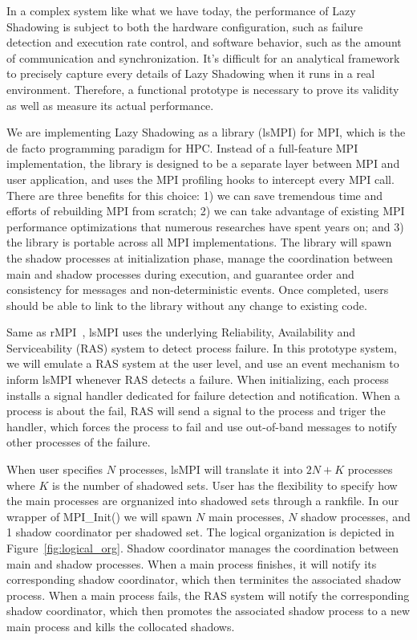 In a complex system like what we have today, the performance of Lazy Shadowing is subject to both the hardware configuration, such as failure detection and execution rate control, and software behavior, such as the amount of communication and synchronization. 
It's difficult for an analytical framework to precisely capture every details of Lazy Shadowing when it runs in a real environment. Therefore, a functional prototype is necessary to prove its validity as well as measure its actual performance. 

We are implementing Lazy Shadowing as a library (lsMPI) for MPI, which is the de facto programming paradigm for HPC. Instead of a full-feature MPI implementation, the library is designed to be a separate layer between MPI and user application, and uses the MPI profiling hooks to intercept every MPI call. There are three benefits for this choice: 1) we can save tremendous time and efforts of rebuilding MPI from scratch; 2) we can take advantage of existing MPI performance optimizations that numerous researches have spent years on; and 3) the library is portable across all MPI implementations. 
The library will spawn the shadow processes at initialization phase, manage the coordination between main and shadow processes during execution, and guarantee order and consistency for messages and non-deterministic events.
Once completed, users should be able to link to the library without any change to existing code. 

Same as rMPI~\cite{ferreira_sc_2011}, lsMPI uses the underlying Reliability, Availability and Serviceability (RAS) system to detect process failure. In this prototype system, we will emulate a RAS system at the user level, and use an event mechanism to inform lsMPI whenever RAS detects a failure. When initializing, each process installs a signal handler dedicated for failure detection and notification. When a process is about the fail, RAS will send a signal to the process and triger the handler, which forces the process to fail and use out-of-band messages to notify other processes of the failure. 

When user specifies $N$ processes, lsMPI will translate it into $2N + K$ processes where $K$ is the number of shadowed sets. User has the flexibility to specify how the main processes are orgnanized into shadowed sets through a rankfile. In our wrapper of MPI\_Init() we will spawn $N$ main processes, $N$ shadow processes, and 1 shadow coordinator per shadowed set. The logical organization is depicted in Figure~\ref{fig:logical_org}. Shadow coordinator manages the coordination between main and shadow processes. When a main process finishes, it will notify its corresponding shadow coordinator, which then terminites the associated shadow process. When a main process fails, the RAS system will notify the corresponding shadow coordinator, which then promotes the associated shadow process to a new main process and kills the collocated shadows.

